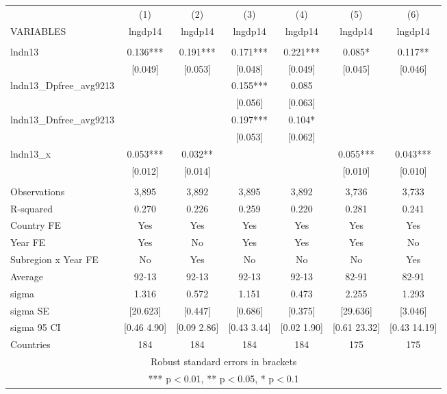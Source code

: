 \begin{tabular}{lcccccc} \hline
 & (1) & (2) & (3) & (4) & (5) & (6) \\
VARIABLES & lngdp14 & lngdp14 & lngdp14 & lngdp14 & lngdp14 & lngdp14 \\ \hline
 &  &  &  &  &  &  \\
lndn13 & 0.136*** & 0.191*** & 0.171*** & 0.221*** & 0.085* & 0.117** \\
 & [0.049] & [0.053] & [0.048] & [0.049] & [0.045] & [0.046] \\
lndn13\_Dpfree\_avg9213 &  &  & 0.155*** & 0.085 &  &  \\
 &  &  & [0.056] & [0.063] &  &  \\
lndn13\_Dnfree\_avg9213 &  &  & 0.197*** & 0.104* &  &  \\
 &  &  & [0.053] & [0.062] &  &  \\
lndn13\_x & 0.053*** & 0.032** &  &  & 0.055*** & 0.043*** \\
 & [0.012] & [0.014] &  &  & [0.010] & [0.010] \\
 &  &  &  &  &  &  \\
Observations & 3,895 & 3,892 & 3,895 & 3,892 & 3,736 & 3,733 \\
R-squared & 0.270 & 0.226 & 0.259 & 0.220 & 0.281 & 0.241 \\
Country FE & Yes & Yes & Yes & Yes & Yes & Yes \\
Year FE & Yes & No & Yes & Yes & Yes & No \\
Subregion x Year FE & No & Yes & No & No & No & Yes \\
Average & 92-13 & 92-13 & 92-13 & 92-13 & 82-91 & 82-91 \\
sigma & 1.316 & 0.572 & 1.151 & 0.473 & 2.255 & 1.293 \\
sigma SE & [20.623] & [0.447] & [0.686] & [0.375] & [29.636] & [3.046] \\
sigma 95 CI & [0.46 4.90] & [0.09 2.86] & [0.43 3.44] & [0.02 1.90] & [0.61 23.32] & [0.43 14.19] \\
 Countries & 184 & 184 & 184 & 184 & 175 & 175 \\ \hline
\multicolumn{7}{c}{ Robust standard errors in brackets} \\
\multicolumn{7}{c}{ *** p$<$0.01, ** p$<$0.05, * p$<$0.1} \\
\end{tabular}
